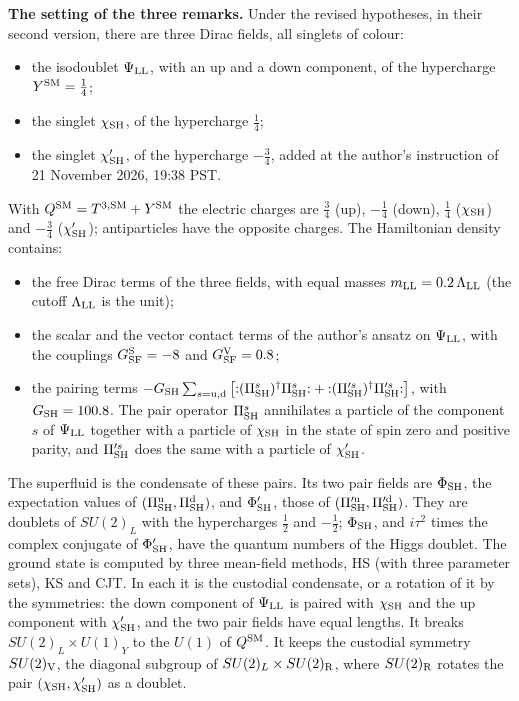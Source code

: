\documentclass[
  10pt,
]{article}
\providecommand{\tightlist}{%
  \setlength{\itemsep}{0pt}\setlength{\parskip}{0pt}}
\begin{document}
\textbf{The setting of the three remarks.} Under the revised hypotheses,
in their second version, there are three Dirac fields, all singlets of
colour:

\begin{itemize}
\tightlist
\item
  the isodoublet \(\Psi_{\rm LL}\), with an up and a down component, of
  the hypercharge \(Y^{\rm SM}=\tfrac14\);
\item
  the singlet \(\chi_{\rm SH}\), of the hypercharge \(\tfrac14\);
\item
  the singlet \(\chi'_{\rm SH}\), of the hypercharge \(-\tfrac34\),
  added at the author's instruction of 21 November 2026, 19:38 PST.
\end{itemize}

With \(Q^{\rm SM}=T^{3,{\rm SM}}+Y^{\rm SM}\) the electric charges are
\(\tfrac34\) (up), \(-\tfrac14\) (down), \(\tfrac14\)
(\(\chi_{\rm SH}\)) and \(-\tfrac34\) (\(\chi'_{\rm SH}\));
antiparticles have the opposite charges. The Hamiltonian density
contains:

\begin{itemize}
\tightlist
\item
  the free Dirac terms of the three fields, with equal masses
  \(m_{\rm LL}=0.2\,\Lambda_{\rm LL}\) (the cutoff \(\Lambda_{\rm LL}\)
  is the unit);
\item
  the scalar and the vector contact terms of the author's ansatz on
  \(\Psi_{\rm LL}\), with the couplings \(G^{\rm S}_{\rm SF}=-8\) and
  \(G^{\rm V}_{\rm SF}=0.8\);
\item
  the pairing terms
  \(-G_{\rm SH}\sum_{s={\rm u},{\rm d}}\big[{:}(\Pi^s_{\rm SH})^\dagger\Pi^s_{\rm SH}{:}+{:}(\Pi'^s_{\rm SH})^\dagger\Pi'^s_{\rm SH}{:}\big]\),
  with \(G_{\rm SH}=100.8\). The pair operator \(\Pi^s_{\rm SH}\)
  annihilates a particle of the component \(s\) of \(\Psi_{\rm LL}\)
  together with a particle of \(\chi_{\rm SH}\) in the state of spin
  zero and positive parity, and \(\Pi'^s_{\rm SH}\) does the same with a
  particle of \(\chi'_{\rm SH}\).
\end{itemize}

The superfluid is the condensate of these pairs. Its two pair fields are
\(\Phi_{\rm SH}\), the expectation values of
\((\Pi^{\rm u}_{\rm SH},\Pi^{\rm d}_{\rm SH})\), and \(\Phi'_{\rm SH}\),
those of \((\Pi'^{\rm u}_{\rm SH},\Pi'^{\rm d}_{\rm SH})\). They are
doublets of \(SU(2)_L\) with the hypercharges \(\tfrac12\) and
\(-\tfrac12\); \(\Phi_{\rm SH}\), and \(i\tau^2\) times the complex
conjugate of \(\Phi'_{\rm SH}\), have the quantum numbers of the Higgs
doublet. The ground state is computed by three mean-field methods, HS
(with three parameter sets), KS and CJT. In each it is the custodial
condensate, or a rotation of it by the symmetries: the down component of
\(\Psi_{\rm LL}\) is paired with \(\chi_{\rm SH}\) and the up component
with \(\chi'_{\rm SH}\), and the two pair fields have equal lengths. It
breaks \(SU(2)_L\times U(1)_Y\) to the \(U(1)\) of \(Q^{\rm SM}\). It
keeps the custodial symmetry \(SU(2)_{\rm V}\), the diagonal subgroup of
\(SU(2)_L\times SU(2)_{\rm R}\), where \(SU(2)_{\rm R}\) rotates the
pair \((\chi_{\rm SH},\chi'_{\rm SH})\) as a doublet.
\end{document}
